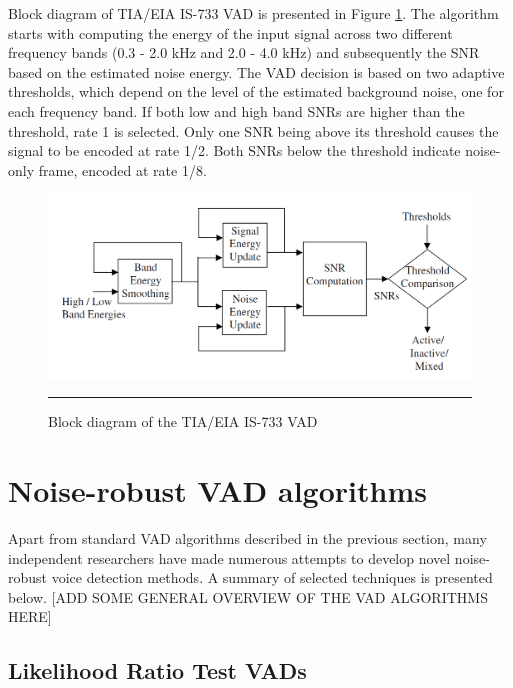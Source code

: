 Block diagram of TIA/EIA IS-733 VAD is presented in Figure \ref{fig:IS733}. The algorithm starts with computing the energy of the input signal across two different frequency bands (0.3 - 2.0 kHz and 2.0 - 4.0 kHz) and subsequently the SNR based on the estimated noise energy. The VAD decision is based on two adaptive thresholds, which depend on the level of the estimated background noise, one for each frequency band. If both low and high band SNRs are higher than the threshold, rate 1 is selected. Only one SNR being above its threshold causes the signal to be encoded at rate 1/2. Both SNRs below the threshold indicate noise-only frame, encoded at rate 1/8.

\begin{figure}[htbp]
	\centering
		\includegraphics[width=0.9\columnwidth]{Figures/IS733.png}
		\rule{37em}{0.5pt}
	\caption[Block diagram of the TIA/EIA IS-733 VAD]{Block diagram of the TIA/EIA IS-733 VAD \cite{Kondoz}}
	\label{fig:IS733}
\end{figure}


\section{Noise-robust VAD algorithms}

Apart from standard VAD algorithms described in the previous section, many independent researchers have made numerous attempts to develop novel noise-robust voice detection methods. A summary of selected techniques is presented below. [ADD SOME GENERAL OVERVIEW OF THE VAD ALGORITHMS HERE]

\subsection{Likelihood Ratio Test VADs}

